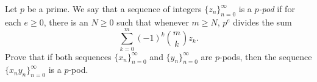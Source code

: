 Let $p$ be a prime. We say that a sequence of integers $\{z_n\}_{n=0}^\infty$ is a \emph{$p$-pod} if for each $e \geq 0$, there is an $N \geq 0$ such that whenever $m \geq N$, $p^e$ divides the sum \[\sum_{k=0}^m (-1)^k {m \choose k} z_k.\] Prove that if both sequences $\{x_n\}_{n=0}^\infty$ and $\{y_n\}_{n=0}^\infty$ are $p$-pods, then the sequence $\{x_ny_n\}_{n=0}^\infty$ is a $p$-pod.